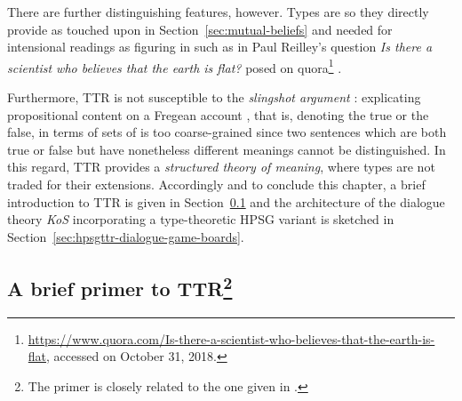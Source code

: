 \documentclass[output=paper]{langsci/langscibook}
\begin{document}
There are further distinguishing features, however.
%
Types are  so they directly provide  as touched upon in Section~\ref{sec:mutual-beliefs} and needed for intensional readings as figuring in  such as in Paul Reilley's question \textit{Is there a scientist who believes that the earth is flat?} posed on quora\footnote{\url{https://www.quora.com/Is-there-a-scientist-who-believes-that-the-earth-is-flat}, accessed on October 31, 2018.} \citep{Cooper:2005:b}.


Furthermore, TTR is not susceptible to the \emph{slingshot argument}  \citep{Barwise:Perry:1983}: explicating propositional content on a Fregean account \citep{Frege:1892}, that is, denoting the true or the false, in terms of sets of  is too coarse-grained since two sentences which are both true or false but have nonetheless different meanings cannot be distinguished.
%
In this regard, TTR provides a \emph{structured theory of meaning},  where types are not traded for their extensions.
%
Accordingly and to conclude this chapter, a brief introduction to TTR is given in Section~\ref{sec:brief-primer-ttr} and the architecture of the dialogue theory \emph{KoS} incorporating a type-theoretic HPSG variant is sketched in Section~\ref{sec:hpsgttr-dialogue-game-boards}.
  




  
\subsection{A brief primer to TTR\protect\footnote{The primer is closely related to the one given in \citet[Sec.~4.1]{Luecking:2018:a}.}}
\label{sec:brief-primer-ttr}
\end{document}

